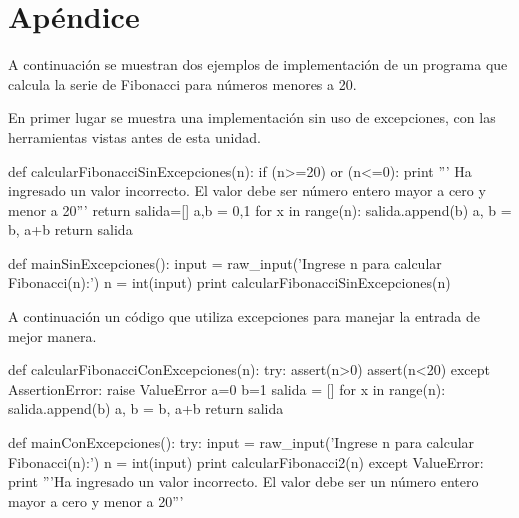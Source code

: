 \section{Apéndice}
A continuación se muestran dos ejemplos de implementación de un programa que
calcula la serie de Fibonacci para números menores a 20.

En primer lugar se muestra una implementación sin uso de excepciones, con
las herramientas vistas antes de esta unidad.

\begin{codigo-python}
def calcularFibonacciSinExcepciones(n):
	if (n>=20) or (n<=0):
		print ''' Ha ingresado un valor incorrecto.
El valor debe ser número entero mayor a cero y menor a 20'''
		return
	salida=[]
	a,b = 0,1
	for x in range(n):
		salida.append(b)
		a, b = b, a+b
	return salida

def mainSinExcepciones():
	input = raw_input('Ingrese n para calcular Fibonacci(n):')
	n = int(input)
	print calcularFibonacciSinExcepciones(n)
\end{codigo-python}

A continuación un código que utiliza excepciones para manejar la entrada de
mejor manera.

\begin{codigo-python}
def calcularFibonacciConExcepciones(n):
	try:
		assert(n>0)
		assert(n<20)
	except AssertionError:
		raise ValueError
	a=0
	b=1
	salida = []
	for x in range(n):
		salida.append(b)
		a, b = b, a+b
	return salida

def mainConExcepciones():
	try:
		input = raw_input('Ingrese n para calcular Fibonacci(n):')
		n = int(input)
		print calcularFibonacci2(n)
	except ValueError:
		print '''Ha ingresado un valor incorrecto.
El valor debe ser un número entero mayor a cero y menor a 20'''
\end{codigo-python}
